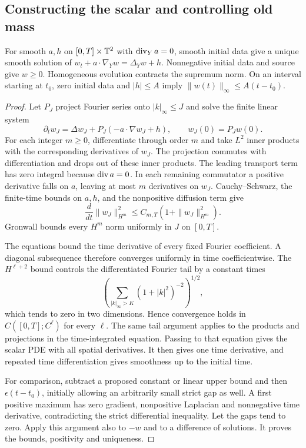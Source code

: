 \subsection{Constructing the scalar and controlling old mass}

\begin{lemma}\label{lem:torus-scalar}
For smooth $a,h$ on $[0,T]\times\mathbb T^2$ with $\operatorname{div}_Ya=0$, smooth
initial data give a unique smooth solution of
$w_t+a\cdot\nabla_Yw=\Delta_Yw+h$.
Nonnegative initial data and source give $w\ge0$.
Homogeneous evolution contracts the supremum norm. On an interval
starting at $t_0$, zero initial data and $|h|\le A$ imply
$\|w(t)\|_\infty\le A(t-t_0)$.
\end{lemma}
\begin{proof}
Let $P_J$ project Fourier series onto $|k|_\infty\le J$ and solve
the finite linear system
\[
 \partial_tw_J=\Delta w_J+P_J(-a\cdot\nabla w_J+h),
 \qquad w_J(0)=P_Jw(0).
\]
For each integer $m\ge0$, differentiate through order $m$ and take
$L^2$ inner products with the corresponding derivatives of $w_J$.
The projection commutes with differentiation and drops out of these
inner products. The leading transport term has zero integral because
$\operatorname{div} a=0$. In each remaining commutator a positive derivative
falls on $a$, leaving at most $m$ derivatives on $w_J$. Cauchy--Schwarz,
the finite-time bounds on $a,h$, and the nonpositive diffusion term give
\[
 \frac d{dt}\|w_J\|_{H^m}^2
       \le C_{m,T}(1+\|w_J\|_{H^m}^2).
\]
Gronwall bounds every $H^m$ norm uniformly in $J$ on $[0,T]$.

The equations bound the time derivative of every fixed Fourier
coefficient. A diagonal subsequence therefore converges uniformly in
time coefficientwise. The $H^{\ell+2}$ bound controls the differentiated
Fourier tail by a constant times
\[
 \left(\sum_{|k|_\infty>K}(1+|k|^2)^{-2}\right)^{1/2},
\]
which tends to zero in two dimensions. Hence convergence holds in
$C([0,T];C^\ell)$ for every $\ell$. The same tail argument applies
to the products and projections in the time-integrated equation.
Passing to that equation gives the scalar PDE with all spatial
derivatives. It then gives one time derivative, and repeated time
differentiation gives smoothness up to the initial time.

For comparison, subtract a proposed constant or linear upper bound
and then $\epsilon(t-t_0)$, initially allowing an arbitrarily small
strict gap as well. A first positive maximum has zero gradient,
nonpositive Laplacian and nonnegative time derivative, contradicting
the strict differential inequality. Let the gaps tend to zero. Apply
this argument also to $-w$ and to a difference of solutions. It proves
the bounds, positivity and uniqueness.
\end{proof}


